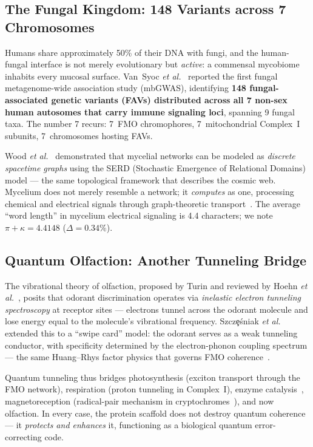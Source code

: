 \documentclass[11pt,twocolumn]{article}
\begin{document}
\subsection{The Fungal Kingdom: 148 Variants across 7 Chromosomes}

Humans share approximately 50\% of their DNA with fungi, and the
human-fungal interface is not merely evolutionary but \emph{active}:
a commensal mycobiome inhabits every mucosal surface.  Van~Syoc
\textit{et al.}~\cite{VanSyoc2025} reported the first fungal
metagenome-wide association study (mbGWAS), identifying
\textbf{148 fungal-associated genetic variants (FAVs) distributed across
all 7 non-sex human autosomes that carry immune signaling loci},
spanning 9 fungal taxa.  The number 7 recurs: 7~FMO chromophores,
7~mitochondrial Complex~I subunits, 7~chromosomes hosting FAVs.

Wood \textit{et al.}~\cite{Wood2023} demonstrated that mycelial
networks can be modeled as \emph{discrete spacetime graphs} using the
SERD (Stochastic Emergence of Relational Domains) model --- the same
topological framework that describes the cosmic web.  Mycelium does not
merely resemble a network; it \emph{computes} as one, processing
chemical and electrical signals through graph-theoretic
transport~\cite{Adamatzky2022}.  The average ``word length'' in
mycelium electrical signaling is 4.4 characters; we note
$\pi + \kappa = 4.4148$ ($\Delta = 0.34\%$).

\subsection{Quantum Olfaction: Another Tunneling Bridge}

The vibrational theory of olfaction, proposed by Turin and reviewed by
Hoehn \textit{et al.}~\cite{Hoehn2018}, posits that odorant
discrimination operates via \emph{inelastic electron tunneling
spectroscopy} at receptor sites --- electrons tunnel across the odorant
molecule and lose energy equal to the molecule's vibrational frequency.
Szcz\c{e}\'sniak \textit{et al.}~\cite{Szczesnik2025} extended this
to a ``swipe card'' model: the odorant serves as a weak tunneling
conductor, with specificity determined by the electron-phonon coupling
spectrum --- the same Huang--Rhys factor physics that governs FMO
coherence~\cite{Lorenzoni2025}.

Quantum tunneling thus bridges photosynthesis (exciton transport through
the FMO network), respiration (proton tunneling in Complex~I), enzyme
catalysis~\cite{Maffei2025,Brookes2017}, magnetoreception (radical-pair
mechanism in cryptochromes~\cite{Brookes2017}), and now olfaction.  In
every case, the protein scaffold does not destroy quantum coherence ---
it \emph{protects and enhances} it, functioning as a biological quantum
error-correcting code.
\end{document}
